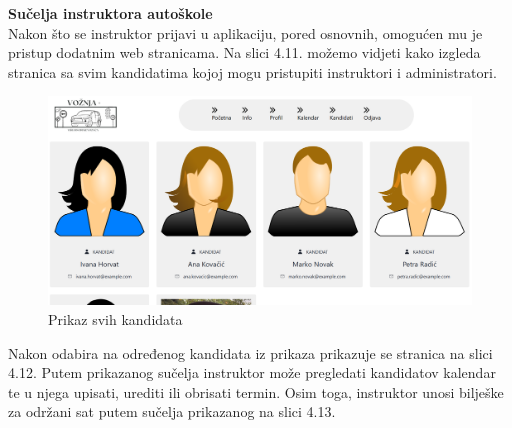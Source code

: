 \noindent \textbf{Sučelja instruktora autoškole }\\

\noindent Nakon što se instruktor prijavi u aplikaciju, pored osnovnih, omogućen mu je pristup dodatnim web stranicama. Na slici 4.11. možemo vidjeti kako izgleda stranica sa svim kandidatima kojoj mogu pristupiti instruktori i administratori.

\begin{figure}[H]
					\includegraphics[width=\textwidth]{slike/instruktor1.png} 
					\centering
					\caption{Prikaz svih kandidata}
					\label{fig:promjene}
				\end{figure}

\noindent Nakon odabira na određenog kandidata iz prikaza prikazuje se stranica na slici 4.12. Putem prikazanog sučelja instruktor može pregledati kandidatov kalendar te u njega upisati, urediti ili obrisati termin. Osim toga, instruktor unosi bilješke za održani sat putem sučelja prikazanog na slici 4.13.


